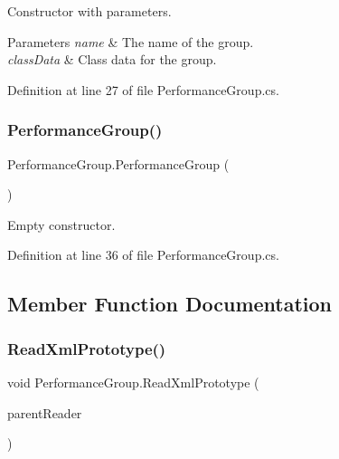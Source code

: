 Constructor with parameters. 


\begin{DoxyParams}{Parameters}
{\em name} & The name of the group. \\
\hline
{\em class\+Data} & Class data for the group. \\
\hline
\end{DoxyParams}


Definition at line 27 of file Performance\+Group.\+cs.

\mbox{\label{class_performance_group_ad6c5d883468c6505a052523f7c63a598}} 
\subsubsection{\texorpdfstring{Performance\+Group()}{PerformanceGroup()}\hspace{0.1cm}{\footnotesize\ttfamily [2/2]}}
{\footnotesize\ttfamily Performance\+Group.\+Performance\+Group (\begin{DoxyParamCaption}{ }\end{DoxyParamCaption})}



Empty constructor. 



Definition at line 36 of file Performance\+Group.\+cs.



\subsection{Member Function Documentation}
\mbox{\label{class_performance_group_a2be3d2af8490e938844a93d5ce9044bd}} 
\subsubsection{\texorpdfstring{Read\+Xml\+Prototype()}{ReadXmlPrototype()}}
{\footnotesize\ttfamily void Performance\+Group.\+Read\+Xml\+Prototype (\begin{DoxyParamCaption}\item[{Xml\+Reader}]{parent\+Reader }\end{DoxyParamCaption})}



